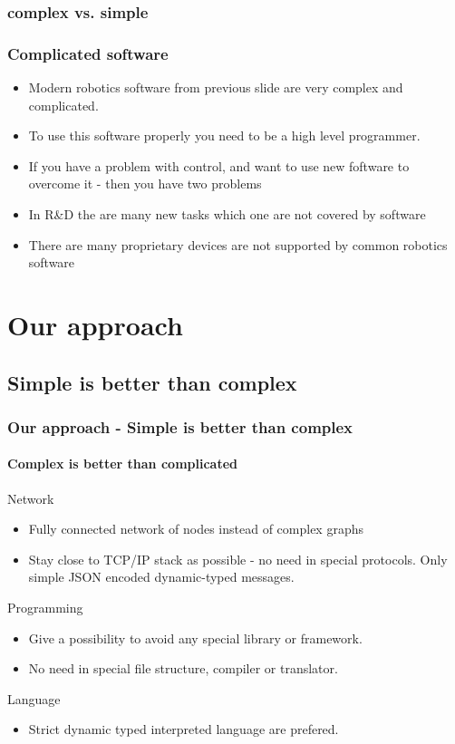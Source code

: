 \documentclass{beamer}
\begin{document}
\subsubsection{complex vs. simple}
\begin{frame}
\frametitle{Complicated software}
\begin{itemize}
  \item<1> {Modern robotics software from previous slide are very complex and
  complicated.}
  \item<1> {To use this software properly you need to be a high level
  programmer.}
  \item<1> {If you have a problem with control, and want to use new foftware to
  overcome it - then you have two problems}
  \item<1> {In R\&D the are many new tasks which one are not covered by
  software}
  \item<1> {There are many proprietary devices are not supported by common
  robotics software}
\end{itemize}
\end{frame}

\section{Our approach}
\subsection{Simple is better than complex}
\begin{frame}
\frametitle{Our approach - Simple is better than complex}
\framesubtitle{Complex is better than complicated}
Network
\begin{itemize}
  \item<1> Fully connected network of nodes instead of complex graphs
  \item<1> Stay close to TCP/IP stack as possible - no need in special
  protocols. Only simple JSON encoded dynamic-typed messages.
\end{itemize}

Programming
\begin{itemize}
  \item<1> Give a possibility to avoid any special library or
  framework.
  \item<1> No need in special file structure, compiler or translator.
\end{itemize}

Language
\begin{itemize}
  \item Strict dynamic typed interpreted language are prefered.
\end{itemize}
\end{frame}
\end{document}
